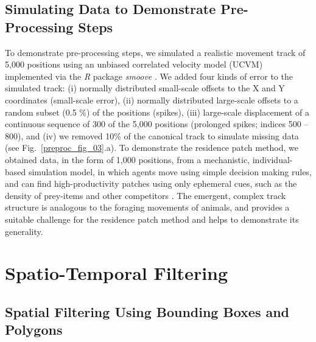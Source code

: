     \subsection*{Simulating Data to Demonstrate Pre-Processing Steps}

    To demonstrate pre-processing steps, we simulated a realistic movement track of 5,000 positions using an unbiased correlated velocity model (UCVM) implemented via the \textit{R} package \textit{smoove} \citep[][see Fig.~\ref{preproc_fig_03}.a]{gurarie2017}.
    We added four kinds of error to the simulated track: (i) normally distributed small-scale offsets to the X and Y coordinates (small-scale error), (ii) normally distributed large-scale offsets to a random subset (0.5 \%) of the positions (spikes), (iii) large-scale displacement of a continuous sequence of 300 of the 5,000 positions (prolonged spikes; indices 500 -- 800), and (iv) we removed 10\% of the canonical track to simulate missing data (see Fig.~\ref{preproc_fig_03}.a).
    To demonstrate the residence patch method, we obtained data, in the form of 1,000 positions, from a mechanistic, individual-based simulation model, in which agents move using simple decision making rules, and can find high-productivity patches using only ephemeral cues, such as the density of prey-items and other competitors \citep{gupte2021a, netz2021}.
    The emergent, complex track structure is analogous to the foraging movements of animals, and provides a suitable challenge for the residence patch method and helps to demonstrate its generality.

    \section*{Spatio-Temporal Filtering}

    \subsection*{Spatial Filtering Using Bounding Boxes and Polygons}

